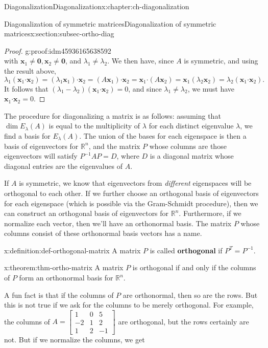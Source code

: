 \documentclass[oneside,10pt,]{book}
\newcommand{\terminology}[1]{\textbf{#1}}
\numberwithin{equation}{section}
\newcommand{\bbm}{\begin{bmatrix}}
\newcommand{\ebm}{\end{bmatrix}}
\newcommand{\R}{\mathbb{R}}
\newcommand{\dotp}{\!\boldsymbol{\cdot}\!}
\newcommand{\xx}{\mathbf{x}}
\newcommand{\amp}{&}
\begin{document}
\begin{chapterptx}{Diagonalization}{}{Diagonalization}{}{}{x:chapter:ch-diagonalization}
\begin{sectionptx}{Diagonalization of symmetric matrices}{}{Diagonalization of symmetric matrices}{}{}{x:section:subsec-ortho-diag}
\begin{proof}{}{g:proof:idm45936165638592}
\begin{equation*}
\end{equation*}
with \(\xx_1\neq\mathbf{0},\xx_2\neq \mathbf{0}\), and \(\lambda_1\neq \lambda_2\). We then have, since \(A\) is symmetric, and using the result above,%
\begin{equation*}
\lambda_1(\xx_1\dotp \xx_2) = (\lambda_1\xx_1)\dotp \xx_2 = (A\xx_1)\dotp \xx_2 = \xx_1\dotp(A\xx_2) = \xx_1(\lambda_2\xx_2) = \lambda_2(\xx_1\dotp\xx_2)\text{.}
\end{equation*}
It follows that \((\lambda_1-\lambda_2)(\xx_1\dotp \xx_2)=0\), and since \(\lambda_1\neq \lambda_2\), we must have \(\xx_1\dotp \xx_2=0\).%
\end{proof}
The procedure for diagonalizing a matrix is as follows: assuming that \(\dim E_\lambda(A)\) is equal to the multiplicity of \(\lambda\) for each distinct eigenvalue \(\lambda\), we find a basis for \(E_\lambda(A)\). The union of the bases for each eigenspace is then a basis of eigenvectors for \(\R^n\), and the matrix \(P\) whose columns are those eigenvectors will satisfy \(P^{-1}AP = D\), where \(D\) is a diagonal matrix whose diagonal entries are the eigenvalues of \(A\).%
\par
If \(A\) is symmetric, we know that eigenvectors from \emph{different} eigenspaces will be orthogonal to each other. If we further choose an orthogonal basis of eigenvectors for each eigenspace (which is possible via the Gram-Schmidt procedure), then we can construct an orthogonal basis of eigenvectors for \(\R^n\). Furthermore, if we normalize each vector, then we'll have an orthonormal basis. The matrix \(P\) whose columns consist of these orthonormal basis vectors has a name.%
\begin{definition}{}{x:definition:def-orthogonal-matrix}%
A matrix \(P\) is called \terminology{orthogonal} if \(P^T = P^{-1}\).%
\end{definition}
\begin{theorem}{}{}{x:theorem:thm-ortho-matrix}%
A matrix \(P\) is orthogonal if and only if the columns of \(P\) form an orthonormal basis for \(\R^n\).%
\end{theorem}
A fun fact is that if the columns of \(P\) are orthonormal, then so are the rows. But this is not true if we ask for the columns to be merely orthogonal. For example, the columns of \(A = \bbm 1\amp 0\amp 5\\-2\amp 1\amp 2\\1\amp 2\amp -1\ebm \) are orthogonal, but the rows certainly are not. But if we normalize the columns, we get%
\begin{equation*}

\end{equation*}
\end{sectionptx}
\end{chapterptx}
\end{document}

